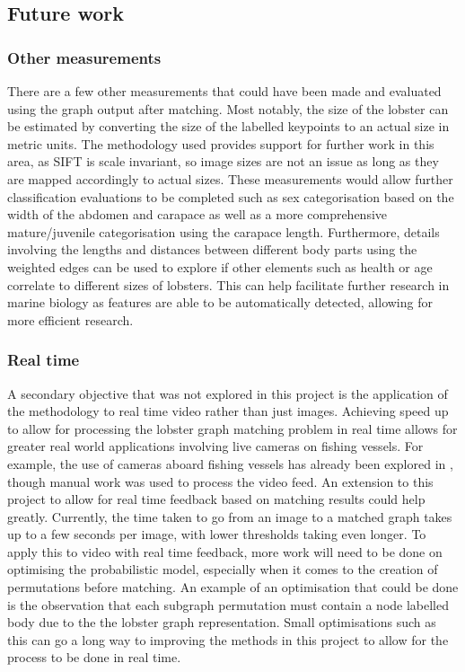 \subsection{Future work}
\subsubsection{Other measurements}
There are a few other measurements that could have been made and evaluated using the graph output after matching. Most notably, the size of the lobster can be estimated by converting the size of the labelled keypoints to an actual size in metric units. The methodology used provides support for further work in this area, as SIFT is scale invariant, so image sizes are not an issue as long as they are mapped accordingly to actual sizes. These measurements would allow further classification evaluations to be completed such as sex categorisation based on the width of the abdomen and carapace \cite{lobster-video} as well as a more comprehensive mature/juvenile categorisation using the carapace length. Furthermore, details involving the lengths and distances between different body parts using the weighted edges can be used to explore if other elements such as health or age correlate to different sizes of lobsters. This can help facilitate further research in marine biology as features are able to be automatically detected, allowing for more efficient research. 

\subsubsection{Real time}
A secondary objective that was not explored in this project is the application of the methodology to real time video rather than just images. Achieving speed up to allow for processing the lobster graph matching problem in real time allows for greater real world applications involving live cameras on fishing vessels. For example, the use of cameras aboard fishing vessels has already been explored in \cite{lobster-video}, though manual work was used to process the video feed. An extension to this project to allow for real time feedback based on matching results could help greatly. Currently, the time taken to go from an image to a matched graph takes up to a few seconds per image, with lower thresholds taking even longer. To apply this to video with real time feedback, more work will need to be done on optimising the probabilistic model, especially when it comes to the creation of permutations before matching. An example of an optimisation that could be done is the observation that each subgraph permutation must contain a node labelled body due to the the lobster graph representation. Small optimisations such as this can go a long way to improving the methods in this project to allow for the process to be done in real time. 

